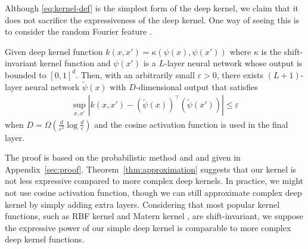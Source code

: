 
Although \eqref{eq:kernel-def} is the simplest form of the deep kernel, we claim that it does not sacrifice the expressiveness of the deep kernel. One way of seeing this is to consider the random Fourier feature \citep{Rahimi2008}.

\begin{thm}\label{thm:approximation}
    Given deep kernel function $k(x, x') = \kappa(\psi(x), \psi(x'))$ where $\kappa$ is the shift-invariant kernel function and $\psi(x')$ is a $L$-layer neural network whose output is bounded to $[0,1]^d$. Then, with an arbitrarily small $\varepsilon >0$, there exists $(L+1)$-layer neural network $\tilde{\psi}(x)$ with $D$-dimensional output that satisfies
    \begin{align*}
        \sup_{x, x'} |k(x, x') - (\tilde{\psi}(x))^\top (\tilde{\psi}(x'))|  \leq  \varepsilon     
    \end{align*}
    when $D = \Omega(\frac{d}{\varepsilon^2} \log \frac{d}{\varepsilon})$ and the cosine activation function is used in the final layer.
\end{thm}

The proof is based on the probabilistic method \citep{alon04} and \citep[Claim~1]{Rahimi2008} and given in Appendix~\ref{sec:proof}. Theorem~\ref{thm:approximation} suggests that our kernel is not less expressive compared to more complex deep kernels. In practice, we might not use cosine activation function, though we can still approximate complex deep kernel by simply adding extra layers. Considering that most popular kernel functions, such as RBF kernel and Matern kernel \citep{Rasmussen2005}, are shift-invariant, we suppose the expressive power of our simple deep kernel is comparable to more complex deep kernel functions.

